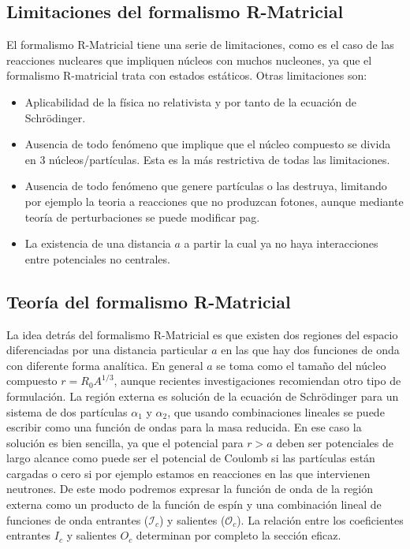\documentclass[fleqn,11pt]{SelfArx} %
\newcommand{\Ical}{\mathcal{I}}
\newcommand{\Ocal}{\mathcal{O}}
\begin{document}
\subsection{Limitaciones del formalismo R-Matricial}

El formalismo R-Matricial tiene una serie de limitaciones, como es el caso de las reacciones nucleares que impliquen núcleos con muchos nucleones, ya que el formalismo R-matricial trata con estados estáticos. Otras limitaciones son:

\begin{itemize}
	\item Aplicabilidad de la física no relativista y por tanto de la ecuación de Schrödinger.
	\item Ausencia de todo fenómeno que implique que el núcleo compuesto se divida en 3 núcleos/partículas. Esta es la más restrictiva de todas las limitaciones.
	\item Ausencia de todo fenómeno que genere partículas o las destruya, limitando por ejemplo la teoria a reacciones que no produzcan fotones, aunque mediante teoría de perturbaciones se puede modificar \cite{Biblia} pag. 
	\item La existencia de una distancia $a$ a partir la cual ya no haya interacciones entre potenciales no centrales. 
\end{itemize}




\subsection{Teoría del formalismo R-Matricial}

La idea detrás del formalismo R-Matricial es que existen dos regiones del espacio diferenciadas por una distancia particular $a$ en las que hay dos funciones de onda con diferente forma analítica.  En general $a$ se toma como el tamaño del núcleo compuesto $r=R_0A^{1/3}$, aunque recientes investigaciones recomiendan otro tipo de formulación. La región externa es solución de la ecuación de Schrödinger para un sistema de dos partículas $\alpha_1$ y $\alpha_2$, que usando combinaciones lineales se puede escribir como una función de ondas para la masa reducida. En ese caso la solución es bien sencilla, ya que el potencial para $r>a$ deben ser potenciales de largo alcance como puede ser el potencial de Coulomb si las partículas están cargadas o cero si por ejemplo estamos en reacciones en las que intervienen neutrones. De este modo podremos expresar la función de onda de la región externa como un producto de la función de espín y una combinación lineal de funciones de onda entrantes ($\Ical_c$) y salientes ($\Ocal_c$). La relación entre los coeficientes entrantes $I_c$ y salientes $O_c$ determinan por completo la sección eficaz.
\end{document}
